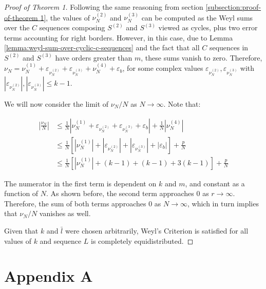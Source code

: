 \documentclass[11pt,a4paper]{tesis}
\theoremstyle{plain}
\theoremstyle{definition}
\begin{document}
\begin{proof}[Proof of Theorem 1]
  Following the same reasoning from section \ref{subsection:proof-of-theorem 1}, the values of $\nu_N^{(2)}$ and $\nu_N^{(3)}$ can be computed as the Weyl sums over the $C$ sequences composing $S^{(2)}$ and $S^{(3)}$ viewed as cycles, plus two error terms accounting for right borders. However, in this case, due to Lemma \ref{lemma:weyl-sum-over-cyclic-c-sequences} and the fact that all $C$ sequences in $S^{(2)}$ and $S^{(3)}$ have orders greater than $m$, these sums vanish to zero. Therefore, $\nu_N = \nu^{(1)}_N + \varepsilon_{\nu^{(2)}_N} + \varepsilon_{\nu^{(3)}_N} + \nu^{(4)}_N + \varepsilon_b$, for some complex values $\varepsilon_{\nu^{(2)}_N}, \varepsilon_{\nu^{(3)}_N}$ with $|\varepsilon_{\nu^{(2)}_N}|, |\varepsilon_{\nu^{(3)}_N}| \le k - 1$.

  We will now consider the limit of $\nu_N / N$ as $N \to \infty$. Note that:

  \begin{equation*}
    \begin{aligned}
      \left| \frac{\nu_N}{N} \right|
        & \le \frac{1}{N} \left| \nu^{(1)}_N + \varepsilon_{\nu^{(2)}_N} + \varepsilon_{\nu^{(3)}_N} + \varepsilon_b \right| + \frac{1}{N} \left| \nu^{(4)}_N \right| \\
        & \le \frac{1}{N} \left[ \left| \nu^{(1)}_N \right| + | \varepsilon_{\nu^{(2)}_N} | + | \varepsilon_{\nu^{(3)}_N} | + \left| \varepsilon_b \right| \right] + \frac{p}{N} \\
        & \le \frac{1}{N} \left[ \left| \nu^{(1)}_N \right| + (k - 1) + (k - 1) + 3 (k - 1) \right] + \frac{p}{N}
    \end{aligned}
  \end{equation*}

  The numerator in the first term is dependent on $k$ and $m$, and constant as a function of $N$. As shown before, the second term approaches $0$ as $r \to \infty$. Therefore, the sum of both terms approaches $0$ as $N \to \infty$, which in turn implies that $\nu_N / N$ vanishes as well.

  Given that $k$ and $\bar{l}$ were chosen arbitrarily, Weyl's Criterion is satisfied for all values of $k$ and sequence $L$ is completely equidistributed.

\end{proof}

\appendix

\section*{Appendix A}
\end{document}
